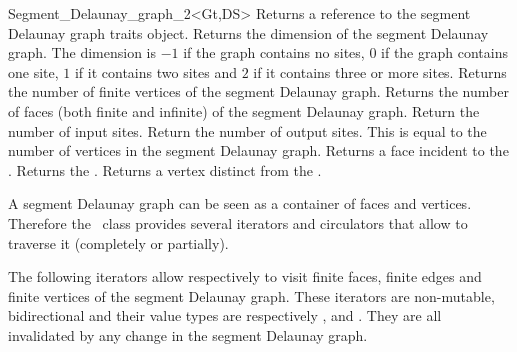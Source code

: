 \begin{ccRefClass}{Segment_Delaunay_graph_2<Gt,DS>}
\ccAccessFunctions
%
{Returns a reference to the segment Delaunay graph traits object.}
\ccGlue
{}
{Returns the dimension of the segment Delaunay graph. The dimension
  is $-1$ if the graph contains no sites, $0$ if the graph
  contains one site, $1$ if it contains two sites and $2$ if it
  contains three or more sites.}
\ccGlue
{}
{Returns the number of finite vertices of the segment Delaunay graph.}
\ccGlue
{}
{Returns the number of faces (both finite and infinite) of the
  segment Delaunay graph.}
\ccGlue
{}
{Return the number of input sites.}
\ccGlue
{}
{Return the number of output sites. This is equal to the number of
vertices in the segment Delaunay graph.}
\ccGlue
{}
{Returns a face incident to the .}
\ccGlue
{}
{Returns the .}
\ccGlue
{}
{Returns a vertex distinct from  the .
}
\ccGlue
{}
\ccGlue
{}
\ccGlue
{}




A segment Delaunay graph can be seen as a container of faces and
vertices. Therefore the \ccRefName\ class provides several iterators
and circulators that allow to traverse it (completely or partially).





The following iterators allow respectively to visit finite faces,
finite edges and  finite vertices of the segment Delaunay graph. These
iterators are non-mutable, bidirectional and their value types are
respectively ,  and . 
They are all invalidated by any change in the segment Delaunay graph.


\end{ccRefClass}
